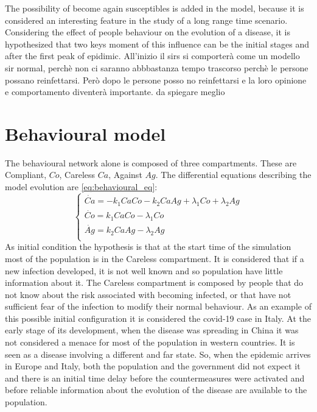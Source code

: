 The possibility of become again susceptibles is added in the model, because it is considered an interesting feature in the study of a long range time scenario. 
Considering the effect of people behaviour on the evolution of a disease, it is hypothesized that two keys moment of this influence can be the initial stages and after the first peak of epidimic. 
All'inizio il sirs si comporterà come un modello sir normal, perchè non ci saranno abbbastanza tempo trascorso perchè le persone possano reinfettarsi. Però dopo le persone posso no reinfettarsi e la loro opinione e comportamento diventerà importante. da spiegare meglio

\section{Behavioural model}
The behavioural network alone is composed of three compartments.
These are Compliant, $Co$, Careless $Ca$, Against $Ag$. 
The differential equations describing the model evolution are \ref{eq:behavioural_eq}: 
\begin{equation}
	\begin{cases}
		\dot{Ca} = -k_1 Ca Co - k_2 Ca Ag + \lambda_1 Co + \lambda_2 Ag \\
		\dot{Co} = k_1 Ca Co -  \lambda_1 Co \\
		\dot{Ag} = k_2 Ca Ag -  \lambda_2 Ag\\
	\end{cases}
	\label{eq:behavioural_eq}
\end{equation}
As initial condition the hypothesis is that at the start time of the simulation most of the population is in the Careless compartment. It is considered that if a new infection developed, it is not well known and so population have little information about it. The Careless compartment is composed by people that do not know about the risk associated with becoming infected, or that have not sufficient fear of the infection to modify their normal behaviour. 
As an example of this possible initial configuration it is considered the covid-19 case in Italy. At the early stage of its development, when the disease was spreading in China it was not considered a menace for most of the population in western countries. It is seen as a disease involving a different and far state. So, when the epidemic arrives in Europe and Italy, both the population and the government did not expect it and there is an initial time delay before the countermeasures were activated and before reliable information about the evolution of the disease are available to the population. 
